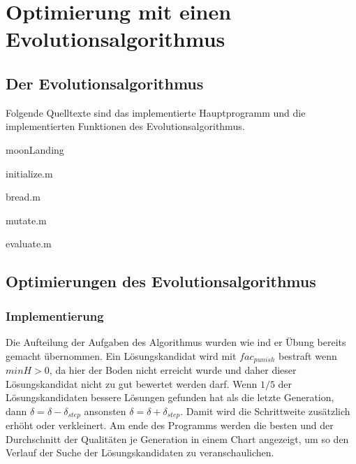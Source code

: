 \section{Optimierung mit einen Evolutionsalgorithmus}
\subsection{Der Evolutionsalgorithmus}
Folgende Quelltexte sind das implementierte Hauptprogramm und die implementierten Funktionen des Evolutionsalgorithmus.

\begin{code}
	\caption{moonLanding}
	\label{fig:moon-landing-m}
\end{code}

\begin{code}
	\caption{initialize.m}
	\label{fig:initialize-m}
\end{code}

\begin{code}
	\caption{bread.m}
	\label{fig:bread-m}
\end{code}

\begin{code}
	\caption{mutate.m}
	\label{fig:mutate-m}
\end{code}

\begin{code}
	\caption{evaluate.m}
	\label{fig:evaluate-m}
\end{code}

\subsection{Optimierungen des Evolutionsalgorithmus}
\subsubsection{Implementierung}
Die Aufteilung der Aufgaben des Algorithmus wurden wie ind er Übung bereits gemacht übernommen. Ein Lösungskandidat wird mit $fac_{punish}$ bestraft wenn $minH > 0$, da hier der Boden nicht erreicht wurde und daher dieser Lösungskandidat nicht zu gut bewertet werden darf. Wenn $1/5$ der Lösungskandidaten bessere Lösungen gefunden hat als die letzte Generation, dann $\delta = \delta - \delta_{step}$ ansonsten $\delta = \delta + \delta_{step}$. Damit wird die Schrittweite zusätzlich erhöht oder verkleinert. 
\newline
\newline
Am ende des Programms werden die besten und der Durchschnitt der Qualitäten je Generation in einem Chart angezeigt, um so den Verlauf der Suche der Lösungskandidaten zu veranschaulichen.

